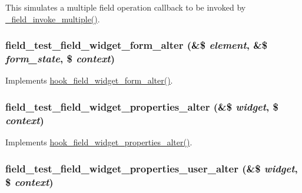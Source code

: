 This simulates a multiple field operation callback to be invoked by \hyperlink{group__field__attach_ga791aeba11e29038daf3e798dbea0df60}{\_\-field\_\-invoke\_\-multiple()}. \hypertarget{field__test_8module_ab697abc140bc395e9712230bb49e10b7}{
\subsubsection[{field\_\-test\_\-field\_\-widget\_\-form\_\-alter}]{\setlength{\rightskip}{0pt plus 5cm}field\_\-test\_\-field\_\-widget\_\-form\_\-alter (\&\$ {\em element}, \/  \&\$ {\em form\_\-state}, \/  \$ {\em context})}}
\label{field__test_8module_ab697abc140bc395e9712230bb49e10b7}
Implements \hyperlink{group__field__widget_gaca9d517ab0584fa2428779d8aa24a441}{hook\_\-field\_\-widget\_\-form\_\-alter()}. \hypertarget{field__test_8module_a9ae0d3439f5afbd93be40ff21b229985}{
\subsubsection[{field\_\-test\_\-field\_\-widget\_\-properties\_\-alter}]{\setlength{\rightskip}{0pt plus 5cm}field\_\-test\_\-field\_\-widget\_\-properties\_\-alter (\&\$ {\em widget}, \/  \$ {\em context})}}
\label{field__test_8module_a9ae0d3439f5afbd93be40ff21b229985}
Implements \hyperlink{group__field__widget_gaa88988bce1ffbec1f481ec7a3ba87e51}{hook\_\-field\_\-widget\_\-properties\_\-alter()}. \hypertarget{field__test_8module_a7b260f9df700defdebb5dd957512f799}{
\subsubsection[{field\_\-test\_\-field\_\-widget\_\-properties\_\-user\_\-alter}]{\setlength{\rightskip}{0pt plus 5cm}field\_\-test\_\-field\_\-widget\_\-properties\_\-user\_\-alter (\&\$ {\em widget}, \/  \$ {\em context})}}
